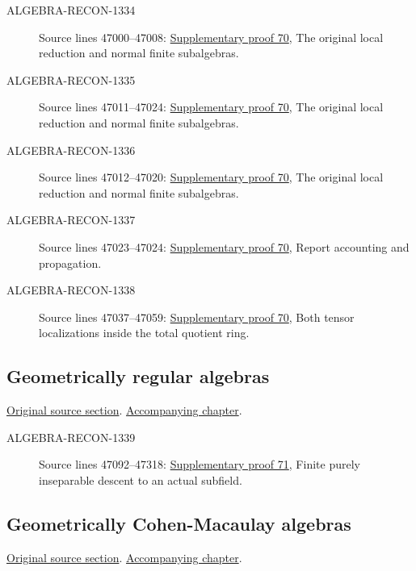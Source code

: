 \begin{description}
\item[ALGEBRA-RECON-1334] Source lines 47000--47008: \hyperlink{algebra_geonormal_notes_20260929}{Supplementary proof 70}, The original local reduction and normal finite subalgebras.
\item[ALGEBRA-RECON-1335] Source lines 47011--47024: \hyperlink{algebra_geonormal_notes_20260929}{Supplementary proof 70}, The original local reduction and normal finite subalgebras.
\item[ALGEBRA-RECON-1336] Source lines 47012--47020: \hyperlink{algebra_geonormal_notes_20260929}{Supplementary proof 70}, The original local reduction and normal finite subalgebras.
\item[ALGEBRA-RECON-1337] Source lines 47023--47024: \hyperlink{algebra_geonormal_notes_20260929}{Supplementary proof 70}, Report accounting and propagation.
\item[ALGEBRA-RECON-1338] Source lines 47037--47059: \hyperlink{algebra_geonormal_notes_20260929}{Supplementary proof 70}, Both tensor localizations inside the total quotient ring.
\end{description}

\subsection{Geometrically regular algebras}
\hypertarget{algebra-source-section-geometrically-regular}{}
\noindent\href{https://github.com/stacks/stacks-project/blob/a04446e57ec1fbc252a871afcec7752fb2807b14/algebra.tex\#L47092}{Original source section}. \href{algebra.pdf\#nameddest=section-geometrically-regular}{Accompanying chapter}.

\begin{description}
\item[ALGEBRA-RECON-1339] Source lines 47092--47318: \hyperlink{algebra_georeg_cm_notes_20260929}{Supplementary proof 71}, Finite purely inseparable descent to an actual subfield.
\end{description}

\subsection{Geometrically Cohen-Macaulay algebras}
\hypertarget{algebra-source-section-geometrically-CM}{}
\noindent\href{https://github.com/stacks/stacks-project/blob/a04446e57ec1fbc252a871afcec7752fb2807b14/algebra.tex\#L47255}{Original source section}. \href{algebra.pdf\#nameddest=section-geometrically-CM}{Accompanying chapter}.

